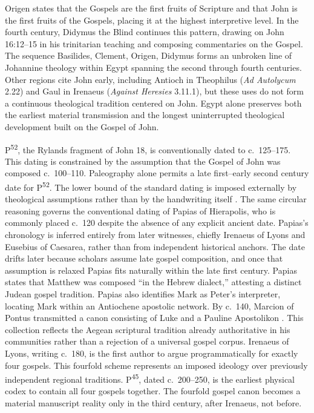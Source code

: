 Origen states that the Gospels are the first fruits of Scripture and that John is the first fruits of the Gospels, placing it at the highest interpretive level.
In the fourth century, Didymus the Blind continues this pattern, drawing on John 16:12--15 in his trinitarian teaching and composing commentaries on the Gospel.
The sequence Basilides, Clement, Origen, Didymus forms an unbroken line of Johannine theology within Egypt spanning the second through fourth centuries.
Other regions cite John early, including Antioch in Theophilus (\emph{Ad Autolycum} 2.22) and Gaul in Irenaeus (\emph{Against Heresies} 3.11.1), but these uses do not form a continuous theological tradition centered on John.
Egypt alone preserves both the earliest material transmission and the longest uninterrupted theological development built on the Gospel of John.

P\textsuperscript{52}, the Rylands fragment of John 18, is conventionally dated to c.~125--175.
This dating is constrained by the assumption that the Gospel of John was composed c.~100--110.
Paleography alone permits a late first--early second century date for P\textsuperscript{52}.
The lower bound of the standard dating is imposed externally by theological assumptions rather than by the handwriting itself \cite{nongbri:p52}.
The same circular reasoning governs the conventional dating of Papias of Hierapolis, who is commonly placed c.~120 despite the absence of any explicit ancient date.
Papias's chronology is inferred entirely from later witnesses, chiefly Irenaeus of Lyons and Eusebius of Caesarea, rather than from independent historical anchors.
The date drifts later because scholars assume late gospel composition, and once that assumption is relaxed Papias fits naturally within the late first century.
Papias states that Matthew was composed ``in the Hebrew dialect,'' attesting a distinct Judean gospel tradition.
Papias also identifies Mark as Peter's interpreter, locating Mark within an Antiochene apostolic network.
By c.~140, Marcion of Pontus transmitted a canon consisting of Luke and a Pauline Apostolikon \cite{tertullian:marcionem}.
This collection reflects the Aegean scriptural tradition already authoritative in his communities rather than a rejection of a universal gospel corpus.
Irenaeus of Lyons, writing c.~180, is the first author to argue programmatically for exactly four gospels.
This fourfold scheme represents an imposed ideology over previously independent regional traditions.
P\textsuperscript{45}, dated c.~200--250, is the earliest physical codex to contain all four gospels together.
The fourfold gospel canon becomes a material manuscript reality only in the third century, after Irenaeus, not before.

